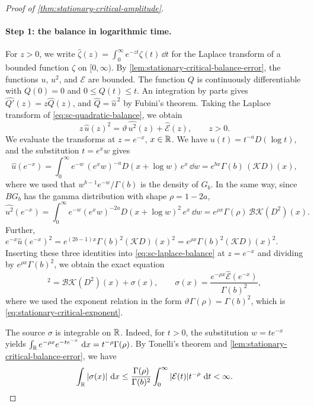 \begin{proof}[Proof of \cref{thm:stationary-critical-amplitude}]
\paragraph{Step 1: the balance in logarithmic time.} For $z>0$, we write $\widehat\zeta(z)=\int_0^\infty e^{-zt}\zeta(t)\,\dd t$ for the Laplace transform of a bounded function $\zeta$ on $[0,\infty)$. By \cref{lem:stationary-critical-balance-error}, the functions $u$, $u^2$, and $\mathcal E$ are bounded. The function $Q$ is continuously differentiable with $Q(0)=0$ and $0\le Q(t)\le t$. An integration by parts gives $\widehat{Q'}(z)=z\widehat Q(z)$, and $\widehat Q=\widehat u^{\,2}$ by Fubini's theorem. Taking the Laplace transform of \eqref{eq:sc-quadratic-balance}, we obtain
\begin{equation}\label{eq:sc-laplace-balance}
 z\,\widehat u(z)^2=\vartheta\,\widehat{u^2}(z)+\widehat{\mathcal E}(z),\qquad z>0 .
\end{equation}
We evaluate the transforms at $z=e^{-x}$, $x\in\mathbb R$. We have $u(t)=t^{-a}D(\log t)$, and the substitution $t=e^xw$ gives
\[
 \widehat u(e^{-x})=\int_0^\infty e^{-w}\,(e^xw)^{-a}D(x+\log w)\,e^x\,\dd w
 =e^{bx}\Gamma(b)\,(\mathcal KD)(x),
\]
where we used that $w^{b-1}e^{-w}/\Gamma(b)$ is the density of $G_b$. In the same way, since $BG_b$ has the gamma distribution with shape $\rho=1-2a$,
\[
 \widehat{u^2}(e^{-x})=\int_0^\infty e^{-w}(e^xw)^{-2a}D(x+\log w)^2\,e^x\,\dd w
 =e^{\rho x}\Gamma(\rho)\,\mathcal B\mathcal K(D^2)(x).
\]
Further, $e^{-x}\widehat u(e^{-x})^2=e^{(2b-1)x}\Gamma(b)^2(\mathcal KD)(x)^2=e^{\rho x}\Gamma(b)^2(\mathcal KD)(x)^2$. Inserting these three identities into \eqref{eq:sc-laplace-balance} at $z=e^{-x}$ and dividing by $e^{\rho x}\Gamma(b)^2$, we obtain the exact equation
\begin{equation}
 [\mathcal KD(x)]^2=\mathcal B\mathcal K(D^2)(x)+\sigma(x),
 \qquad
 \sigma(x)=\frac{e^{-\rho x}\widehat{\mathcal E}(e^{-x})}
                   {\Gamma(b)^2},
 \label{eq:sc-log-renewal-balance}
\end{equation}
where we used the exponent relation in the form $\vartheta\Gamma(\rho)=\Gamma(b)^2$, which is \eqref{eq:stationary-critical-exponent}.

The source $\sigma$ is integrable on $\mathbb R$. Indeed, for $t>0$, the substitution $w=te^{-x}$ yields $\int_\mathbb R e^{-\rho x}e^{-te^{-x}}\,\mathop{}\!\mathrm d x=t^{-\rho}\Gamma(\rho)$. By Tonelli's theorem and \cref{lem:stationary-critical-balance-error}, we have
\begin{equation}
 \int_{\mathbb R}|\sigma(x)|\,\mathop{}\!\mathrm d x
 \le\frac{\Gamma(\rho)}{\Gamma(b)^2}
       \int_0^\infty|\mathcal E(t)|t^{-\rho}\,\mathop{}\!\mathrm d t<\infty.
 \label{eq:sc-log-source-integrable}
\end{equation}


\end{proof}
